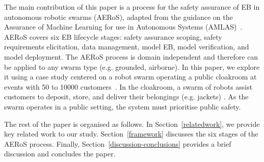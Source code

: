 \documentclass[runningheads]{llncs}
\begin{document}
The main contribution of this paper is a process for the safety assurance of EB in autonomous robotic swarms (AERoS), adapted from the guidance on the Assurance of Machine Learning for use in Autonomous Systems (AMLAS)~\cite{Hawkins2021}. %
AERoS covers six EB lifecycle stages: safety assurance scoping, safety requirements elicitation, data management, model EB, model verification, and model deployment. 
The AERoS process is domain independent and therefore can be applied to any swarm type (e.g. grounded, airborne). 
In this paper, we explore it using a case study centered on a robot swarm operating a public cloakroom at events with 50 to 10000 customers~\cite{Jones2020}. 
In the cloakroom, a swarm of robots assist customers to deposit, store, and deliver their belongings (e.g. jackets) \cite{Jones2020}. 
As the swarm operates in a public setting, the system must prioritise public safety. 

The rest of the paper is organised as follows. 
In Section~\ref{relatedwork}, we provide key related work to our study. Section~\ref{framework} discusses the six stages of the AERoS process. Finally, Section~\ref{discussion-conclusions} provides a brief discussion and concludes the paper. 
\end{document}

